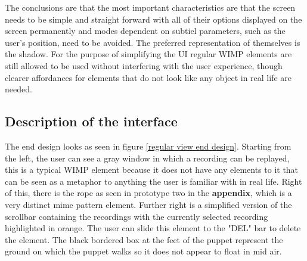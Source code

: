 The conclusions are that the most important characteristics are that the screen needs to be simple and straight forward with all of their options displayed on the screen permanently and modes dependent on subtiel parameters, such as the user's position, need to be avoided. The preferred representation of themselves is the shadow. For the purpose of simplifying the UI regular WIMP elements are still allowed to be used without interfering with the user experience, though clearer affordances for elements that do not look like any object in real life are needed. 


\subsection{Description of the interface}

The end design looks as seen in figure \ref{regular view end design}. Starting from the left, the user can see a gray window in which a recording can be replayed, this is a typical WIMP element because it does not have any elements to it that can be seen as a metaphor to anything the user is familiar with in real life. Right of this, there is the rope as seen in prototype two in the \textbf{ appendix}, which is a very distinct mime pattern element. Further right is a simplified version of the scrollbar containing the recordings with the currently selected recording highlighted in orange. The user can slide this element to the "DEL" bar to delete the element. The black bordered box at the feet of the puppet represent the ground on which the puppet walks so it does not appear to float in mid air.

